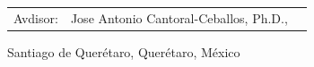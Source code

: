 \documentclass[11pt, a4paper, oneside]{assets/tex/thesis} %
\begin{document}
\begin{titlepage}
\begin{center}
\begin{table}[!h]
\begin{center}
\begin{tabular}{lll}
\multicolumn{1}{r}{Avdisor:} &Jose Antonio Cantoral-Ceballos, Ph.D.,
\end{tabular}
\end{center}
\end{table}

\vspace{3cm}
Santiago de Querétaro, Querétaro, México \\

{\large {}}\\[1.5cm]
\vfill
\end{center}

\end{titlepage}


\clearpage %



 
\end{document}
